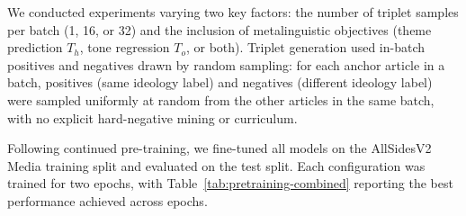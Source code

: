 We conducted experiments varying two key factors: the number of triplet samples per batch (1, 16, or 32) and the inclusion of metalinguistic objectives (theme prediction $T_h$, tone regression $T_o$, or both). Triplet generation used in-batch positives and negatives drawn by random sampling: for each anchor article in a batch, positives (same ideology label) and negatives (different ideology label) were sampled uniformly at random from the other articles in the same batch, with no explicit hard-negative mining or curriculum.

Following continued pre-training, we fine-tuned all models on the AllSidesV2 Media training split and evaluated on the test split. Each configuration was trained for two epochs, with Table~\ref{tab:pretraining-combined} reporting the best performance achieved across epochs.

